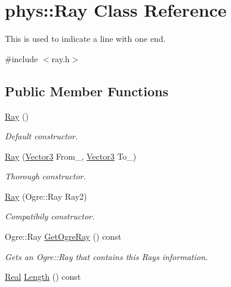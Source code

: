 \hypertarget{classphys_1_1Ray}{
\section{phys::Ray Class Reference}
\label{df/d57/classphys_1_1Ray}
}


This is used to indicate a line with one end.  




{\ttfamily \#include $<$ray.h$>$}

\subsection*{Public Member Functions}
\begin{DoxyCompactItemize}
\item 
\hyperlink{classphys_1_1Ray_a35f4f5eec653ea561353163eaad672d3}{Ray} ()
\begin{DoxyCompactList}\small\item\em Default constructor. \item\end{DoxyCompactList}\item 
\hyperlink{classphys_1_1Ray_aa6123ef37a2351e6cca3954c23212379}{Ray} (\hyperlink{classphys_1_1Vector3}{Vector3} From\_\-, \hyperlink{classphys_1_1Vector3}{Vector3} To\_\-)
\begin{DoxyCompactList}\small\item\em Thorough constructor. \item\end{DoxyCompactList}\item 
\hyperlink{classphys_1_1Ray_a395485ffe19e6a53966730c01a2781c1}{Ray} (Ogre::Ray Ray2)
\begin{DoxyCompactList}\small\item\em Compatibily constructor. \item\end{DoxyCompactList}\item 
Ogre::Ray \hyperlink{classphys_1_1Ray_a0c29b1a55f42ff60d224f16cc0910cdb}{GetOgreRay} () const 
\begin{DoxyCompactList}\small\item\em Gets an Ogre::Ray that contains this Rays information. \item\end{DoxyCompactList}\item 
\hyperlink{namespacephys_af7eb897198d265b8e868f45240230d5f}{Real} \hyperlink{classphys_1_1Ray_add544025fcd6d1cdcfed3c0413b3701b}{Length} () const 

\end{DoxyCompactItemize}
